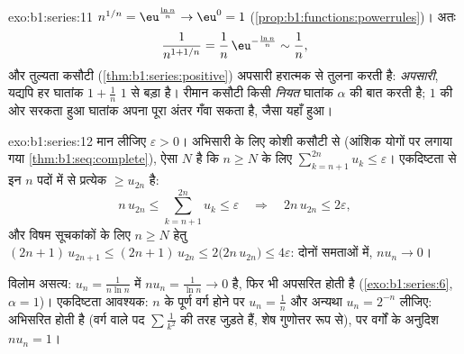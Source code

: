 \begin{solution}{exo:b1:series:11}
$n^{1/n} = \eu^{\frac{\ln n}{n}} \to \eu^0 = 1$
(\cref{prop:b1:functions:powerrules})। अतः
\[
\frac{1}{n^{1 + 1/n}} = \frac{1}{n}\,\eu^{-\frac{\ln n}{n}}
\sim \frac{1}{n} ,
\]
और तुल्यता कसौटी (\cref{thm:b1:series:positive}) अपसारी हरात्मक  से
तुलना करती है: \emph{अपसारी}, यद्यपि हर घातांक $1 + \frac1n$ $1$ से बड़ा है।
रीमान कसौटी किसी \emph{नियत} घातांक $\alpha$ की बात करती है; $1$ की ओर सरकता
हुआ घातांक अपना पूरा अंतर गँवा सकता है, जैसा यहाँ हुआ।
\end{solution}

\begin{solution}{exo:b1:series:12}
मान लीजिए $\varepsilon > 0$। अभिसारी  के लिए कोशी कसौटी से (आंशिक
योगों पर लगाया गया \cref{thm:b1:seq:complete}), ऐसा $N$ है कि $n \geq N$ के
लिए $\sum_{k=n+1}^{2n} u_k \leq \varepsilon$। एकदिष्टता से इन $n$ पदों में
से प्रत्येक $\geq u_{2n}$ है:
\[
n\,u_{2n} \leq \sum_{k=n+1}^{2n} u_k \leq \varepsilon
\quad\Longrightarrow\quad 2n\,u_{2n} \leq 2\varepsilon ,
\]
और विषम सूचकांकों के लिए $n \geq N$ हेतु $(2n+1)\,u_{2n+1} \leq
(2n+1)\,u_{2n} \leq 2\bigl(2n\,u_{2n}\bigr) \leq 4\varepsilon$: दोनों समताओं
में, $n u_n \to 0$।

विलोम असत्य: $u_n = \frac{1}{n\ln n}$ में $n u_n = \frac{1}{\ln n} \to 0$
है, फिर भी  अपसरित होती है (\cref{exo:b1:series:6}, $\alpha = 1$)।
एकदिष्टता आवश्यक: $n$ के पूर्ण वर्ग होने पर $u_n = \frac1n$ और अन्यथा $u_n =
2^{-n}$ लीजिए:  अभिसरित होती है (वर्ग वाले पद $\sum \frac{1}{k^2}$ की
तरह जुड़ते हैं, शेष गुणोत्तर रूप से), पर वर्गों के अनुदिश $n u_n = 1$।
\end{solution}

